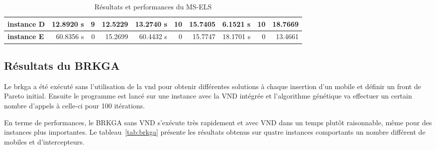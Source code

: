 \begin{table}[H]
\begin{tabular}{l|r|r|r|r|r|r|r|r|r|}
                \multicolumn{1}{|l|}{\textbf{instance D}} & 12.8920 s                           & 9                                             & 12.5229                                         & 13.2740 s                           & 10                                            & 15.7405                                         & 6.1521 s                            & 10                                            & 18.7669                                         \\ \hline
                \multicolumn{1}{|l|}{\textbf{instance E}} & 60.8356 s                           & 0                                             & 15.2699                                         & 60.4432 s                           & 0                                             & 15.7747                                         & 18.1701 s                           & 0                                             & 13.4661                                         \\ \hline
                \end{tabular}
                \caption{Résultats et performances du MS-ELS}
                \label{tab:msels}
            \end{table} 

        \subsection{Résultats du BRKGA}
			
			Le \acrlong{brkga} a été exécuté sans l'utilisation de la \acrshort{vnd} pour obtenir différentes solutions à chaque insertion d'un mobile et définir un front de Pareto initial. Ensuite le programme est lancé sur une instance avec la VND intégrée et l'algorithme génétique va effectuer un certain nombre d'appels à celle-ci pour 100 itérations.
			
			En terme de performances, le BRKGA sans VND s'exécute très rapidement et avec VND dans un temps plutôt raisonnable, même pour des instances plus importantes. Le tableau~\ref{tab:brkga} présente les résultats obtenus sur quatre instances comportants un nombre différent de mobiles et d'intercepteurs.
			
